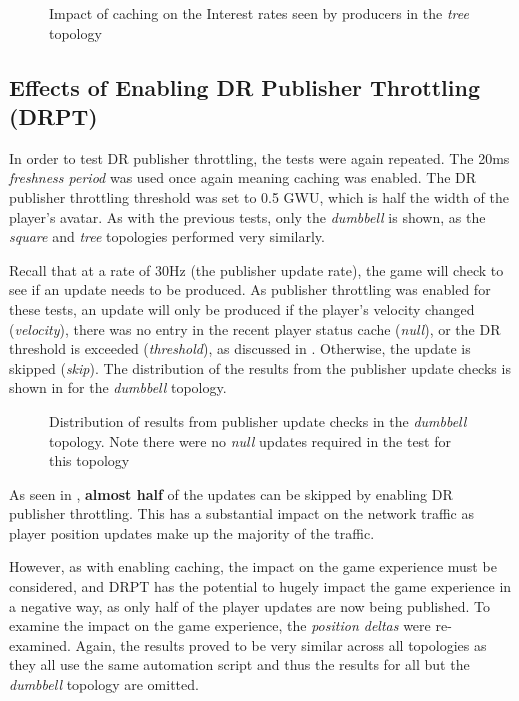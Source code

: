 \begin{figure}[H]
    \centering
    \caption{Impact of caching on the Interest rates seen by producers in the \textit{tree} topology}
    \label{fig:eval:caching:interest-impact-tree}
\end{figure}

\subsection{Effects of Enabling DR Publisher Throttling (DRPT)}
In order to test DR publisher throttling, the tests were again repeated. The 20ms \textit{freshness period} was used once again meaning caching was enabled. The DR publisher throttling threshold was set to 0.5 GWU, which is half the width of the player's avatar. As with the previous tests, only the \textit{dumbbell} is shown, as the \textit{square} and \textit{tree} topologies performed very similarly.

Recall that at a rate of 30Hz (the publisher update rate), the game will check to see if an update needs to be produced. As publisher throttling was enabled for these tests, an update will only be produced if the player's velocity changed (\textit{velocity}), there was no entry in the recent player status cache (\textit{null}), or the DR threshold is exceeded (\textit{threshold}), as discussed in . Otherwise, the update is skipped (\textit{skip}). The distribution of the results from the publisher update checks is shown in  for the \textit{dumbbell} topology.

\begin{figure}[H]
    \centering
    \caption{Distribution of results from publisher update checks in the \textit{dumbbell} topology. Note there were no \textit{null} updates required in the test for this topology}
    \label{fig:eval:caching:dr-pub-throt:counters:dumbbell}
\end{figure}

As seen in , \textbf{almost half} of the updates can be skipped by enabling DR publisher throttling. This has a substantial impact on the network traffic as player position updates make up the majority of the traffic.

However, as with enabling caching, the impact on the game experience must be considered, and DRPT has the potential to hugely impact the game experience in a negative way, as only half of the player updates are now being published. To examine the impact on the game experience, the \textit{position deltas} were re-examined. Again, the results proved to be very similar across all topologies as they all use the same automation script and thus the results for all but the \textit{dumbbell} topology are omitted.

